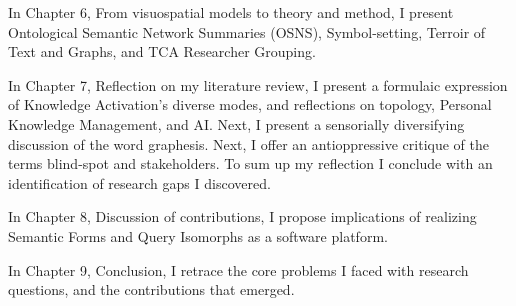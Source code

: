 In Chapter 6, From visuospatial models to theory and method, I present Ontological Semantic Network Summaries (OSNS), Symbol-setting, Terroir of Text and Graphs, and TCA Researcher Grouping. 

In Chapter 7, Reflection on my literature review, I present a formulaic expression of Knowledge Activation's diverse modes, and reflections on topology, Personal Knowledge Management, and AI. Next, I present a sensorially diversifying discussion of the word graphesis. Next, I offer an antioppressive critique of the terms blind-spot and stakeholders. To sum up my reflection I conclude with an identification of research gaps I discovered. 

In Chapter 8, Discussion of contributions, I propose implications of realizing Semantic Forms and Query Isomorphs as a software platform. 

In Chapter 9, Conclusion, I retrace the core problems I faced with research questions, and the contributions that emerged. 